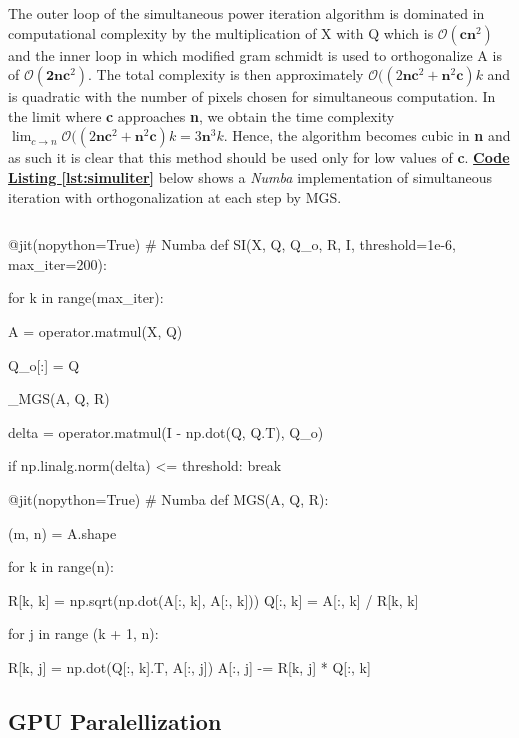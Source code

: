 \documentclass[12pt]{article}
\begin{document}
The outer loop of the simultaneous power iteration algorithm is dominated in computational complexity by the multiplication of X with Q which is $\mathcal{O}(\textbf{cn}^2)$ and the inner loop in which modified gram schmidt is used to orthogonalize A is of $\mathcal{O}(\textbf{2nc}^2)$. The total complexity is then approximately $\mathcal{O}((2\textbf{nc}^2+\textbf{n}^2\textbf{c})k$ and is quadratic with the number of pixels chosen for simultaneous computation. In the limit where \textbf{c} approaches \textbf{n}, we obtain the time complexity $\lim_{c \to n} \mathcal{O}((2\textbf{nc}^2+\textbf{n}^2\textbf{c})k=3\textbf{n}^3k$. Hence, the algorithm becomes cubic in \textbf{n} and as such it is clear that this method should be used only for low values of \textbf{c}. \textbf{\hyperref[lst:simuliter]{Code Listing \ref*{lst:simuliter}}} below shows a \textit{Numba} implementation of simultaneous iteration with orthogonalization at each step by MGS.
\pagebreak
\begin{lstlisting}[frame=none,caption={Calculating Principal Components with Eigenvalue Decomposition via Simultaneous Power Iteration},captionpos=b,label=lst:simuliter]
\end{lstlisting}
\begin{python}
@jit(nopython=True) # Numba
def SI(X, Q, Q_o, R, I, threshold=1e-6, max_iter=200):

    for k in range(max_iter):

        A = operator.matmul(X, Q)

        Q_o[:] = Q

        _MGS(A, Q, R)

        delta = operator.matmul(I - np.dot(Q, Q.T), Q_o)

        if np.linalg.norm(delta) <= threshold:
            break

@jit(nopython=True) # Numba
def MGS(A, Q, R):

    (m, n) = A.shape

    for k in range(n):

        R[k, k] = np.sqrt(np.dot(A[:, k], A[:, k]))
        Q[:, k] = A[:, k] / R[k, k]

        for j in range (k + 1, n):

            R[k, j] = np.dot(Q[:, k].T, A[:, j])
            A[:, j] -= R[k, j] * Q[:, k]
\end{python}

\subsection{GPU Paralellization}\label{3.4}
\end{document}
